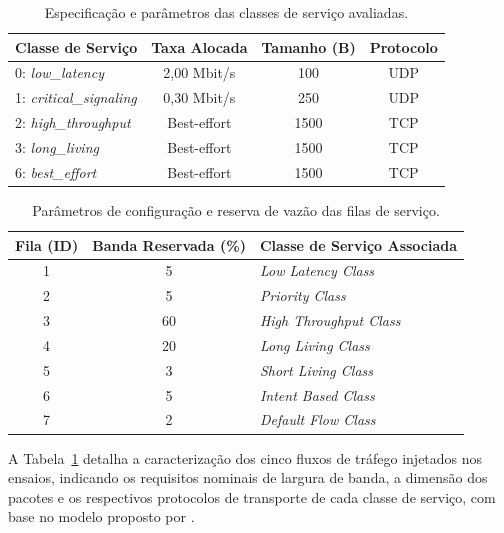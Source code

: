 \begin{table}[htbp]
\centering

\begin{tabularx}{\textwidth}{Xccc}
\toprule
\textbf{Classe de Serviço} & \textbf{Taxa Alocada} & \textbf{Tamanho (B)} & \textbf{Protocolo} \\
\midrule
0: \textit{low\_latency}        & 2,00 Mbit/s  & 100  & UDP \\
1: \textit{critical\_signaling}  & 0,30 Mbit/s  & 250  & UDP \\
2: \textit{high\_throughput}     & Best-effort  & 1500 & TCP \\
3: \textit{long\_living}         & Best-effort  & 1500 & TCP \\
6: \textit{best\_effort}         & Best-effort  & 1500 & TCP \\
\bottomrule
\end{tabularx}
\caption{Especificação e parâmetros das classes de serviço avaliadas.}
\label{tab:classes_servico}
\end{table}

\begin{table}[htbp]
\centering

\begin{tabularx}{\textwidth}{ccX}
\toprule
\textbf{Fila (ID)} & \textbf{Banda Reservada (\%)} & \textbf{Classe de Serviço Associada} \\
\midrule
1 & 5  & \textit{Low Latency Class} \\
2 & 5  & \textit{Priority Class} \\
3 & 60 & \textit{High Throughput Class} \\
4 & 20 & \textit{Long Living Class} \\
5 & 3  & \textit{Short Living Class} \\
6 & 5  & \textit{Intent Based Class} \\
7 & 2  & \textit{Default Flow Class} \\
\bottomrule
\end{tabularx}
\caption{Parâmetros de configuração e reserva de vazão das filas de serviço.}
\label{tab:filas_classe_servico}
\end{table}

A Tabela~\ref{tab:classes_servico} detalha a caracterização dos cinco fluxos de tráfego injetados nos ensaios, indicando os requisitos nominais de largura de banda, a dimensão dos pacotes e os respectivos protocolos de transporte de cada classe de serviço, com base no modelo proposto por \textcite{puttaswamy2025pathaware}.